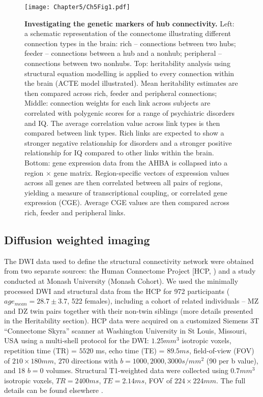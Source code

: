 \begin{figure}[h!]
\begin{center}
\texttt{[image: Chapter5/Ch5Fig1.pdf]}%
\end{center}
\caption{\textbf{Investigating the genetic markers of hub connectivity.} 
Left: a schematic representation of the connectome illustrating different connection types in the brain: rich – connections between two hubs; feeder – connections between a hub and a nonhub; peripheral – connections between two nonhubs. Top: heritability analysis using structural equation modelling is applied to every connection within the brain (ACTE model illustrated). Mean heritability estimates are then compared across rich, feeder and peripheral connections; Middle: connection weights for each link across subjects are correlated with polygenic scores for a range of psychiatric disorders and IQ. The average correlation value across link types is then compared between link types. Rich links are expected to show a stronger negative relationship for disorders and a stronger positive relationship for IQ compared to other links within the brain. Bottom: gene expression data from the AHBA is collapsed into a region $\times$ gene matrix. Region-specific vectors of expression values across all genes are then correlated between all pairs of regions, yielding a measure of transcriptional coupling, or correlated gene expression (CGE). Average CGE values are then compared across rich, feeder and peripheral links.}
\label{fig:Ch5Fig1}
\end{figure}

\subsection*{Diffusion weighted imaging}
\label{sec:DWI}

The DWI data used to define the structural connectivity network were obtained from two separate sources: the Human Connectome Project [HCP, \citep{VanEssen2013}) and a study conducted at Monash University (Monash Cohort). We used the minimally processed DWI and structural data from the HCP for 972 participants ($age_{mean} = 28.7 \pm 3.7$, 522 females), including a cohort of related individuals – MZ and DZ twin pairs together with their non-twin siblings (more details presented in the Heritability section). HCP data were acquired on a customized Siemens 3T ``Connectome Skyra'' scanner at Washington University in St Louis, Missouri, USA using a multi‐shell protocol for the DWI: $1.25 mm^{3}$ isotropic voxels, repetition time (TR) = $5520$ ms, echo time (TE) = $89.5 ms$,  field-of-view (FOV) of $210 \times 180 mm$, $270$ directions with $b = 1000, 2000, 3000 s/mm^{2}$ (90 per b value), and 18 $b = 0$ volumes. Structural T1-weighted data were collected using $0.7 mm^{3}$ isotropic voxels, $TR = 2400 ms$, $TE = 2.14 ms$, FOV of $224 \times 224 mm$. The full details can be found elsewhere \citep{Glasser2013}. 

